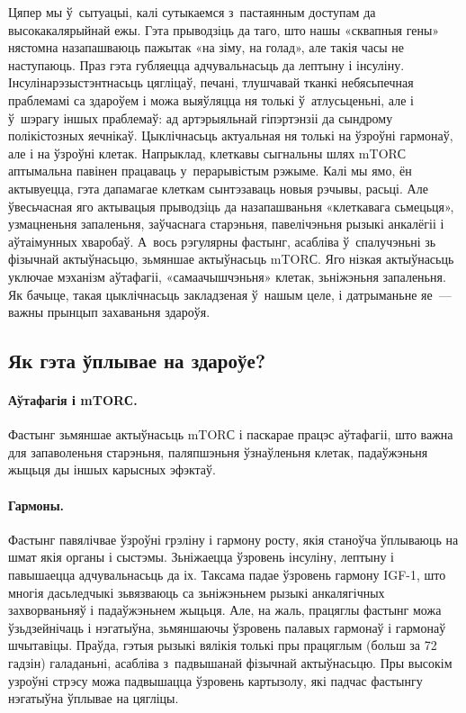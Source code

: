 
Цяпер мы ў~сытуацыі, калі сутыкаемся з~пастаянным доступам да высокакалярыйнай ежы. Гэта прыводзіць да таго, што нашы «сквапныя гены» нястомна назапашваюць пажытак «на зіму, на голад», але такія часы не наступаюць. Праз гэта губляецца адчувальнасьць да лептыну і інсуліну. Інсулінарэзыстэнтнасьць цягліцаў, печані, тлушчавай тканкі небясьпечная праблемамі са здароўем і можа выяўляцца ня толькі ў~атлусьценьні, але і ў~шэрагу іншых праблемаў: ад артэрыяльнай гіпэртэнзіі да сындрому полікістозных яечнікаў.
Цыклічнасьць актуальная ня толькі на ўзроўні гармонаў, але і на ўзроўні клетак. Напрыклад, клеткавы сыгнальны шлях mTORС аптымальна павінен працаваць у~перарывістым рэжыме. Калі мы ямо, ён актывуецца, гэта дапамагае клеткам сынтэзаваць новыя рэчывы, расьці. Але ўвесьчасная яго актывацыя прыводзіць да назапашваньня «клеткавага сьмецьця», узмацненьня запаленьня, заўчаснага старэньня, павелічэньня рызыкі анкалёгіі і аўтаімунных хваробаў. А~вось рэгулярны фастынг, асабліва ў~спалучэньні зь фізычнай актыўнасьцю, зьмяншае актыўнасьць mTORС. Яго нізкая актыўнасьць уключае мэханізм аўтафагіі, «самаачышчэньня» клетак, зьніжэньня запаленьня. Як бачыце, такая цыклічнасьць закладзеная ў~нашым целе, і датрыманьне яе~--- важны прынцып захаваньня здароўя.

\subsection{Як гэта ўплывае на здароўе?}

\paragraph{Аўтафагія і mTORС.}
Фастынг зьмяншае актыўнасьць mTORС і паскарае працэс аўтафагіі, што важна для запаволеньня старэньня, паляпшэньня ўзнаўленьня клетак, падаўжэньня жыцьця ды іншых карысных эфэктаў.

\paragraph{Гармоны.}
Фастынг павялічвае ўзроўні грэліну і гармону росту, якія станоўча ўплываюць на шмат якія органы і сыстэмы. Зьніжаецца ўзровень інсуліну, лептыну і павышаецца адчувальнасьць да іх. Таксама падае ўзровень гармону IGF-1, што многія дасьледчыкі зьвязваюць са зьніжэньнем рызыкі анкалягічных захворваньняў і падаўжэньнем жыцьця. Але, на жаль, працяглы фастынг можа ўзьдзейнічаць і нэгатыўна, зьмяншаючы ўзровень палавых гармонаў і гармонаў шчытавіцы. Праўда, гэтыя рызыкі вялікія толькі пры працяглым (больш за 72 гадзін) галаданьні, асабліва з~падвышанай фізычнай актыўнасьцю. Пры высокім узроўні стрэсу можа падвышацца ўзровень картызолу, які падчас фастынгу нэгатыўна ўплывае на цягліцы.

